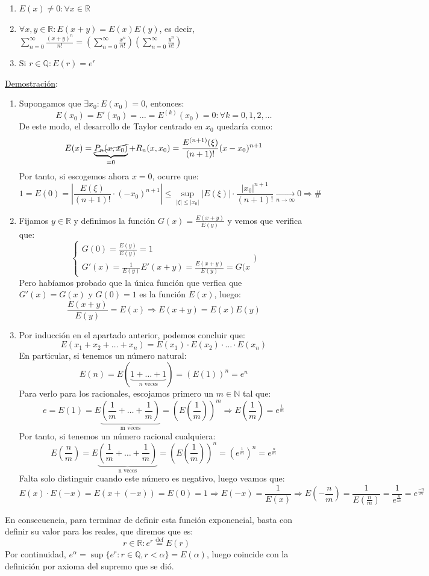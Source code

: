\documentclass[10pt,a4paper,openright]{book}
\theoremstyle{break}
\begin{document}
\begin{enumerate}
\item $E(x) \neq 0 : \forall x \in \mathbb{R}$
\item $\forall x, y \in \mathbb{R} : E(x+y) = E(x) E(y)$, es decir,
$\sum_{n=0}^{\infty} \frac{(x+y)^n}{n!} = \left( \sum_{n=0}^{\infty} \frac{x^n}{n!}\right) \left( \sum_{n=0}^{\infty} \frac{y^n}{n!} \right)$
\item Si $r \in \mathbb{Q} : E(r) = e^r$
\end{enumerate}
\underline{Demostración}:
\begin{enumerate}
\item Supongamos que $\exists x_0 : E(x_0) = 0$, entonces:
$$ E(x_0) = E'(x_0) = \ldots = E^{(k)}(x_0) = 0 : \forall k = 0, 1, 2, \ldots$$
De este modo, el desarrollo de Taylor centrado en $x_0$ quedaría como:
$$E(x) = \underbrace{\cancel{P_n(x, x_0)}}_{=0} + R_n (x, x_0) = \frac{E^{(n+1)} (\xi)}{(n+1)!} (x - x_0)^{n+1}$$
Por tanto, si escogemos ahora $x =0$, ocurre que:
$$1  = E(0) = \left| \frac{E(\xi)}{(n+1)!} \cdot (-x_0)^{n+1} \right| \leq \underset{|\xi| \leq |x_0|}{\sup} |E(\xi)| \cdot \frac{|x_0|^{n+1}}{(n+1)!}\underset{n \to \infty}{\longrightarrow} 0 \Rightarrow \#$$

\item Fijamos $y \in \mathbb{R}$ y definimos la función $G(x) = \frac{E(x+y)}{E(y)}$ y vemos que verifica que:
$$\begin{cases} G(0)= \frac{E(y)}{E(y)} = 1 \\ G'(x) = \frac{1}{E(y)} E'(x+y) = \frac{E(x+y)}{E(y)} = G(x \end{cases})$$
Pero habíamos probado que la única función que verfica que $G'(x) = G(x)$ y $G(0) = 1$ es la función $E(x)$, luego:
$$\frac{E(x+y)}{E(y)} = E(x) \Rightarrow E(x+y) = E(x)E(y)$$

\item Por inducción en el apartado anterior, podemos concluir que:
$$E(x_1 + x_2 + \ldots + x_n) = E(x_1) \cdot E(x_2) \cdot \ldots \cdot E(x_n)$$
En particular, si tenemos un número natural:
$$E(n) = E(\underbrace{ 1 + \ldots + 1}_{n \mbox{ veces}}) = (E(1))^n = e^n$$
Para verlo para los racionales, escojamos primero un $m \in \mathbb{N}$ tal que:
$$e = E(1) = E\underbrace{\left(\frac{1}{m} + \ldots + \frac{1}{m}\right)}_{\mbox{m veces}} = \left(E(\frac{1}{m})\right)^m\Rightarrow E(\frac{1}{m}) = e^\frac{1}{m}$$
Por tanto, si tenemos un número racional cualquiera:
$$E\left(\frac{n}{m}\right) = E\underbrace{\left(\frac{1}{m} + \ldots + \frac{1}{m}\right)}_{\mbox{n veces}} = \left(E(\frac{1}{m})\right)^n = (e^\frac{1}{m})^n = e^\frac{n}{m}$$
Falta solo distinguir cuando este número es negativo, luego veamos que:
$$E(x) \cdot E(-x) = E(x + (-x)) = E(0) = 1 \Rightarrow E(-x) = \frac{1}{E(x)} \Rightarrow E\left(-\frac{n}{m}\right) = \frac{1}{E(\frac{n}{m})} = \frac{1}{e^\frac{n}{m}} = e^{\frac{-n}{m}}$$
\end{enumerate}
En consecuencia, para terminar de definir esta función exponencial, basta con definir su valor para los reales, que diremos que es:
$$r \in \mathbb{R} : e^r \overset{\mbox{def}}{=} E(r)$$
Por continuidad, $e^\alpha = \sup \{e^r : r \in \mathbb{Q}, r < \alpha\} = E(\alpha)$, luego coincide con la definición por axioma del supremo que se dió.
\end{document}
